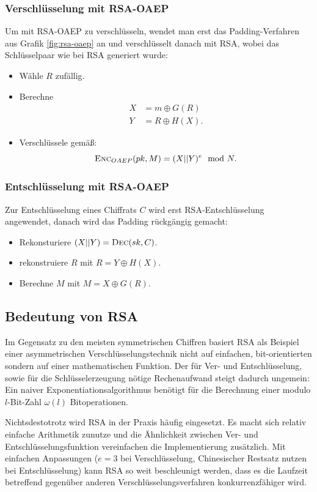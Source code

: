 \subsubsection{Verschlüsselung mit RSA-OAEP} Um mit RSA-OAEP zu
verschlüsseln, wendet man erst das Padding-Verfahren aus Grafik
\ref{fig:rsa-oaep} an und verschlüsselt danach mit RSA, wobei das
Schlüsselpaar wie bei RSA generiert wurde:
\begin{itemize}
\item Wähle $R$ zufällig.
\item Berechne
  \begin{align*} X & = m \oplus G(R) \\ Y & = R \oplus H(X).
  \end{align*}
\item Verschlüssele gemäß:
  \[ \textsc{Enc}_{OAEP}(pk, M) = (X||Y)^e \mod N.
  \]
\end{itemize}
\subsubsection{Entschlüsselung mit RSA-OAEP} Zur Entschlüsselung eines
Chiffrats $C$ wird erst RSA-Entschlüsselung angewendet, danach wird das
Padding rückgängig gemacht:
\begin{itemize}
\item Rekonsturiere $(X||Y) = \textsc{Dec}(sk, C)$.
\item rekonstruiere $R$ mit $R = Y \oplus H(X)$.
\item Berechne $M$ mit $M = X \oplus G(R)$.
\end{itemize}

\subsection{Bedeutung von RSA}\indexRSATextBook\indexRSAOAEP Im
Gegensatz zu den meisten symmetrischen Chiffren basiert RSA als Beispiel
einer asymmetrischen Verschlüsselungstechnik nicht auf einfachen,
bit-orientierten sondern auf einer mathematischen Funktion. Der für Ver-
und Entschlüsselung, sowie für die Schlüsselerzeugung nötige
Rechenaufwand steigt dadurch ungemein: Ein naiver
Exponentiationsalgorithmus benötigt für die Berechnung einer modulo
$l$-Bit-Zahl $\omega(l)$ Bitoperationen.

Nichtsdestotrotz wird RSA in der Praxis häufig eingesetzt. Es macht sich
relativ einfache Arithmetik zunutze und die Ähnlichkeit zwischen Ver-
und Entschlüsselungsfunktion vereinfachen die Implementierung
zusätzlich. Mit einfachen Anpassungen ($e = 3$ bei Verschlüsselung,
Chinesischer Restsatz nutzen bei Entschlüsselung) kann RSA so weit
beschleunigt werden, dass es die Laufzeit betreffend gegenüber anderen
Verschlüsselungsverfahren konkurrenzfähiger wird.

